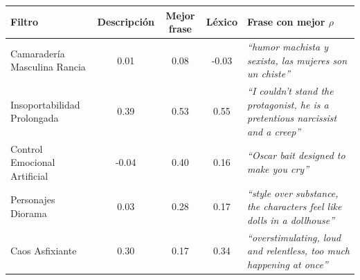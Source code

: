 \begin{tabular}{lcccp{4.6cm}}
\toprule
Filtro & Descripción & Mejor frase & Léxico & Frase con mejor $\rho$ \\
\midrule
Camaradería Masculina Rancia & 0.01 & 0.08 & -0.03 & \emph{``humor machista y sexista, las mujeres son un chiste''} \\
Insoportabilidad Prolongada & 0.39 & 0.53 & 0.55 & \emph{``I couldn't stand the protagonist, he is a pretentious narcissist and a creep''} \\
Control Emocional Artificial & -0.04 & 0.40 & 0.16 & \emph{``Oscar bait designed to make you cry''} \\
Personajes Diorama & 0.03 & 0.28 & 0.17 & \emph{``style over substance, the characters feel like dolls in a dollhouse''} \\
Caos Asfixiante & 0.30 & 0.17 & 0.34 & \emph{``overstimulating, loud and relentless, too much happening at once''} \\
\bottomrule
\end{tabular}
